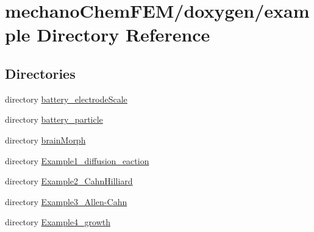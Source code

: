 \section{mechano\+Chem\+F\+E\+M/doxygen/example Directory Reference}
\label{dir_b3001c7d6f49a7b7227b50e4e24b86b5}
\subsection*{Directories}
\begin{DoxyCompactItemize}
\item 
directory \mbox{\hyperlink{dir_35e2a5fb63f0e9effda426dcd3eefdd1}{battery\+\_\+electrode\+Scale}}
\item 
directory \mbox{\hyperlink{dir_d622a1529639912cc452c0109f35d8c0}{battery\+\_\+particle}}
\item 
directory \mbox{\hyperlink{dir_051c84d89afcd9a1c0e44317f1015452}{brain\+Morph}}
\item 
directory \mbox{\hyperlink{dir_c4307ac65a8e862775da89ab360bdb6e}{Example1\+\_\+diffusion\+\_\+eaction}}
\item 
directory \mbox{\hyperlink{dir_6ba90621a44649e75629bb6c83d85235}{Example2\+\_\+\+Cahn\+Hilliard}}
\item 
directory \mbox{\hyperlink{dir_bf6af620bdd5c7265f3b21a58033c63f}{Example3\+\_\+\+Allen-\/\+Cahn}}
\item 
directory \mbox{\hyperlink{dir_df34e1f98057a69a7badbcf9b0acce46}{Example4\+\_\+growth}}
\end{DoxyCompactItemize}

